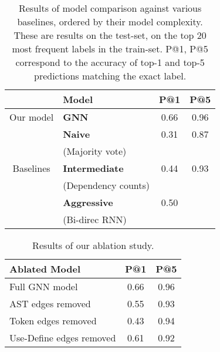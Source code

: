 \begin{table}
 \centering
 {\renewcommand{\arraystretch}{1.3}%
 \begin{tabular}{c|lcc}
 	 ~ & \textbf{Model} & \textbf{P@1} & \textbf{P@5} \\
 	\hline
 	Our model & \textbf{GNN} & 0.66 & 0.96 \\
 	\hline
 	 ~ & \textbf{Naive} & 0.31 & 0.87 \\
 	 ~	 & (Majority vote) & ~ & ~ \\
	\cline{2-4}
	 Baselines & \textbf{Intermediate} & 0.44 & 0.93 \\
 	 ~	 & (Dependency counts) & ~ & ~ \\
 	\cline{2-4}
	 ~	 & \textbf{Aggressive} & 0.50 & ~ \\
 	 ~	 & (Bi-direc RNN) & ~ & ~ \\
 \end{tabular}
}
 \caption{Results of model comparison against various baselines, ordered by their model complexity. These are results on the test-set, on the top 20 most frequent labels in the train-set. P@1, P@5 correspond to the accuracy of top-1 and top-5 predictions matching the exact label.}
 \label{tab:results:baselines}
\end{table}

\begin{table}
	\centering
	 {\renewcommand{\arraystretch}{1.3}%
	 	\begin{tabular}{l|cc}
	 		\textbf{Ablated Model} & \textbf{P@1} & \textbf{P@5} \\
	 		\hline
	 		Full GNN model & 0.66 & 0.96 \\
	 		AST edges removed &  0.55 & 0.93 \\
			Token edges removed & 0.43 & 0.94 \\
			Use-Define edges removed & 0.61 & 0.92 \\
	 	\end{tabular}
	 }
	  \caption{Results of our ablation study.}
	  \label{tab:results:ablations}
\end{table}


